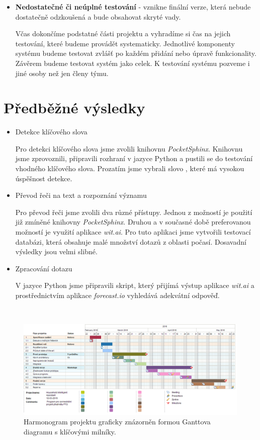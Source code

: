 \documentclass[12pt,a4paper]{article}
\begin{document}
\begin{itemize}
	\item{\textbf{Nedostatečné či neúplné testování}} - vznikne finální verze, která nebude dostatečně odzkoušená a bude obsahovat skryté vady.
	
	Včas dokončíme podstatné části projektu a vyhradíme si čas na jejich testování, které budeme provádět systematicky. Jednotlivé komponenty systému budeme testovat zvlášť po každém přidání nebo úpravě funkcionality. Závěrem budeme testovat systém jako celek. K testování systému pozveme i jiné osoby než jen členy týmu. 
	
\end{itemize}



\section*{Předběžné výsledky}
\begin{itemize}
  \item{Detekce klíčového slova}

  Pro detekci klíčového slova jsme zvolili knihovnu \textit{PocketSphinx}. Knihovnu jsme zprovoznili, připravili rozhraní v jazyce Python a pustili se do testování vhodného klíčového slova. Prozatím jsme vybrali slovo , které má vysokou úspěšnost detekce.

  \item{Převod řeči na text a rozpoznání významu}

  Pro převod řeči jsme zvolili dva různé přístupy. Jednou z možností je použití již zmíněné knihovny \textit{PocketSphinx}. Druhou a v současné době preferovanou možností je využití aplikace \textit{wit.ai}. Pro tuto aplikaci jsme vytvořili testovací databázi, která obsahuje malé množství dotazů z oblasti počasí. Dosavadní výsledky jsou velmi slibné.

  \item{Zpracování dotazu}

  V jazyce Python jsme připravili skript, který přijímá výstup aplikace \textit{wit.ai} a prostřednictvím aplikace \textit{forecast.io} vyhledává adekvátní odpověď.

\end{itemize}

\begin{landscape}
~\vfill
\begin{figure}[ht]
	\begin{center}
	\includegraphics[height = 0.6\textheight ]{PTO-Gantt.png}
	\caption{Harmonogram projektu graficky znázorněn formou Ganttova diagramu s klíčovými milníky.}
	\label{fig:diagram gantt}
	\end{center}
\end{figure}
\vfill
\end{landscape}
\end{document}
